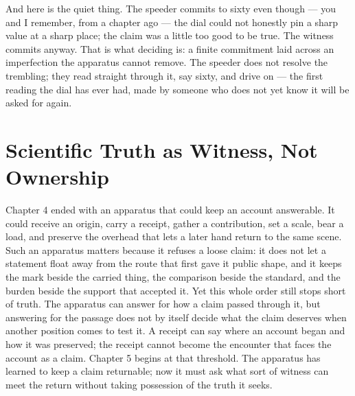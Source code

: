 And here is the quiet thing. The speeder commits to sixty even though --- you and I remember, from a chapter ago --- the dial could not honestly pin a sharp value at a sharp place; the claim was a little too good to be true. The witness commits anyway. That is what deciding is: a finite commitment laid across an imperfection the apparatus cannot remove. The speeder does not resolve the trembling; they read straight through it, say sixty, and drive on --- the first reading the dial has ever had, made by someone who does not yet know it will be asked for again.

\section{Scientific Truth as Witness, Not Ownership}

Chapter 4 ended with an apparatus that could keep an account answerable. It could receive an origin, carry a receipt, gather a contribution, set a scale, bear a load, and preserve the overhead that lets a later hand return to the same scene. Such an apparatus matters because it refuses a loose claim: it does not let a statement float away from the route that first gave it public shape, and it keeps the mark beside the carried thing, the comparison beside the standard, and the burden beside the support that accepted it. Yet this whole order still stops short of truth. The apparatus can answer for how a claim passed through it, but answering for the passage does not by itself decide what the claim deserves when another position comes to test it. A receipt can say where an account began and how it was preserved; the receipt cannot become the encounter that faces the account as a claim. Chapter 5 begins at that threshold. The apparatus has learned to keep a claim returnable; now it must ask what sort of witness can meet the return without taking possession of the truth it seeks.

